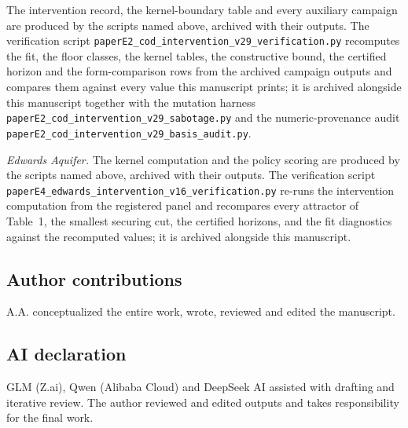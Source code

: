 The intervention record, the kernel-boundary table and every auxiliary
campaign are produced by the scripts named above, archived with their
outputs. The verification script
\texttt{paperE2\_cod\_intervention\_v29\_verification.py} recomputes the
fit, the floor classes, the kernel tables, the constructive bound, the
certified horizon and the form-comparison rows from the archived campaign
outputs and compares them against every value this manuscript prints; it
is archived alongside this manuscript together with the mutation harness
\texttt{paperE2\_cod\_intervention\_v29\_sabotage.py} and the
numeric-provenance audit
\texttt{paperE2\_cod\_intervention\_v29\_basis\_audit.py}.

\emph{Edwards Aquifer.} The kernel computation and the policy scoring are produced by the scripts
named above, archived with their outputs. The verification script
\texttt{paperE4\_edwards\_intervention\_v16\_verification.py} re-runs
the intervention computation from the registered panel and recompares
every attractor of Table~1, the smallest securing cut, the certified
horizons, and the fit diagnostics against the recomputed values; it is
archived alongside this manuscript.

\subsection*{Author contributions}
A.A. conceptualized the entire work, wrote, reviewed and edited the manuscript.

\subsection*{AI declaration}
GLM (Z.ai), Qwen (Alibaba Cloud) and DeepSeek AI assisted with drafting
and iterative review. The author reviewed and edited outputs and takes
responsibility for the final work.


